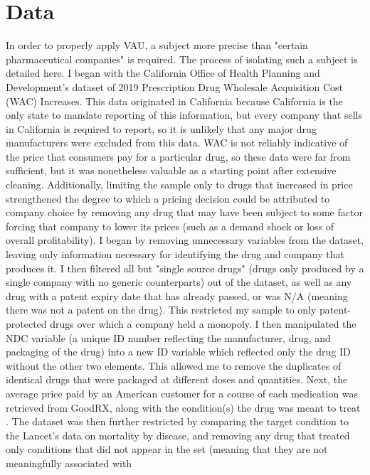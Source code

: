\documentclass[12pt,english]{article} \usepackage{mathptmx}
\begin{document}
\section{Data}\label{sec:data} In order to properly apply VAU, a subject 
more precise than "certain pharmaceutical companies" is required. The 
process of isolating such a subject is detailed here. I began with the 
California Office of Health Planning and Development's dataset of 2019 
Prescription Drug Wholesale Acquisition Cost (WAC) 
Increases\cite{wac20}. This data originated in California because 
California is the only state to mandate reporting of this information, 
but every company that sells in California is required to report, so it 
is unlikely that any major drug manufacturers were excluded from this 
data. WAC is not reliably indicative of the price that consumers pay for 
a particular drug, so these data were far from sufficient, but it was 
nonetheless valuable as a starting point after extensive cleaning. 
Additionally, limiting the sample only to drugs that increased in price 
strengthened the degree to which a pricing decision could be attributed 
to company choice by removing any drug that may have been subject to 
some factor forcing that company to lower its prices (such as a demand 
shock or loss of overall profitability). I began by removing unnecessary 
variables from the dataset, leaving only information necessary for 
identifying the drug and company that produces it. I then filtered all 
but "single source drugs" (drugs only produced by a single company with 
no generic counterparts) out of the dataset, as well as any drug with a 
patent expiry date that has already passed, or was N/A (meaning there 
was not a patent on the drug). This restricted my sample to only 
patent-protected drugs over which a company held a monopoly. I then 
manipulated the NDC variable (a unique ID number reflecting the 
manufacturer, drug, and packaging of the drug) into a new ID variable 
which reflected only the drug ID without the other two elements. This 
allowed me to remove the duplicates of identical drugs that were 
packaged at different doses and quantities. Next, the average price paid 
by an American customer for a course of each medication was retrieved 
from GoodRX, along with the condition(s) the drug was meant to treat 
\cite{goodrx}. The dataset was then further restricted by comparing the 
target condition to the Lancet's data on mortality by disease, and 
removing any drug that treated only conditions that did not appear in 
the set (meaning that they are not meaningfully associated with 
\end{document}

